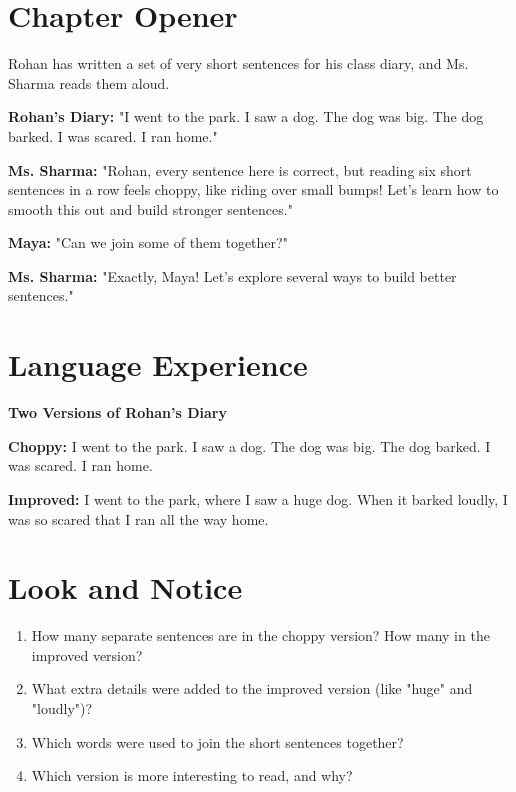 \section{Chapter Opener}
Rohan has written a set of very short sentences for his class diary, and Ms. Sharma reads them aloud.

\textbf{Rohan's Diary:} "I went to the park. I saw a dog. The dog was big. The dog barked. I was scared. I ran home."

\textbf{Ms. Sharma:} "Rohan, every sentence here is correct, but reading six short sentences in a row feels choppy, like riding over small bumps! Let's learn how to smooth this out and build stronger sentences."

\textbf{Maya:} "Can we join some of them together?"

\textbf{Ms. Sharma:} "Exactly, Maya! Let's explore several ways to build better sentences."

\section{Language Experience}
\textbf{Two Versions of Rohan's Diary}

\begin{tcolorbox}[colback=gray!5, colframe=gray!50, sharp corners, boxsep=0pt, left=5pt, right=5pt, top=5pt, bottom=5pt, breakable]
\textbf{Choppy:} I went to the park. I saw a dog. The dog was big. The dog barked. I was scared. I ran home.
\end{tcolorbox}

\begin{tcolorbox}[colback=gray!5, colframe=gray!50, sharp corners, boxsep=0pt, left=5pt, right=5pt, top=5pt, bottom=5pt, breakable]
\textbf{Improved:} I went to the park, where I saw a huge dog. When it barked loudly, I was so scared that I ran all the way home.
\end{tcolorbox}

\section{Look and Notice}
\begin{thinkbox}
\begin{enumerate}
    \item How many separate sentences are in the choppy version? How many in the improved version?
    \item What extra details were added to the improved version (like "huge" and "loudly")?
    \item Which words were used to join the short sentences together?
    \item Which version is more interesting to read, and why?
\end{enumerate}
\end{thinkbox}

